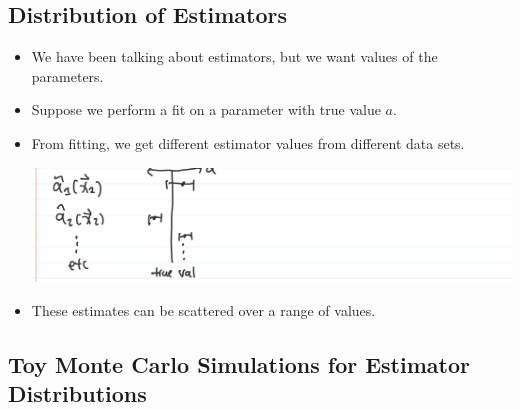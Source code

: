\subsection{Distribution of Estimators}

\begin{itemize}
    \item We have been talking about estimators, but we want values of the parameters.
    \item Suppose we perform a fit on a parameter with true value $a$.
    \item From fitting, we get different estimator values from different data sets.

          \includegraphics[width=0.5\linewidth]{Images/lec11-spread-est-vals.png}

    \item These estimates can be scattered over a range of values.
\end{itemize}

\subsection{Toy Monte Carlo Simulations for Estimator Distributions}

